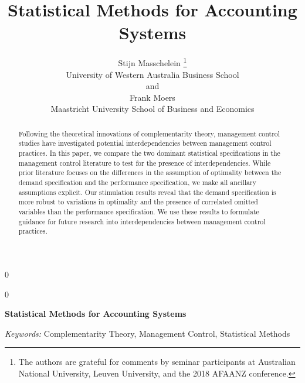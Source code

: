 \documentclass[12pt]{article}
\newcommand{\blind}{0}
\begin{document}
\def\spacingset#1{\renewcommand{\baselinestretch}%
{#1}\small\normalsize} \spacingset{1}


\blind
{
  \title{\bf Statistical Methods for Accounting Systems}

  \author{
        Stijn Masschelein \thanks{The authors are grateful for comments by seminar participants at
Australian National University, Leuven University, and the 2018 AFAANZ
conference.} \\
    University of Western Australia Business School\\
     and \\     Frank Moers \\
    Maastricht University School of Business and Economics\\
      }
  \maketitle
} \fi

\blind
{
  \bigskip
  \bigskip
  \bigskip
  \begin{center}
    {\LARGE\bf Statistical Methods for Accounting Systems}
  \end{center}
  \medskip
} \fi

\bigskip
\begin{abstract}
Following the theoretical innovations of complementarity theory,
management control studies have investigated potential interdependencies
between management control practices. In this paper, we compare the two
dominant statistical specifications in the management control literature
to test for the presence of interdependencies. While prior literature
focuses on the differences in the assumption of optimality between the
demand specification and the performance specification, we make all
ancillary assumptions explicit. Our stimulation results reveal that the
demand specification is more robust to variations in optimality and the
presence of correlated omitted variables than the performance
specification. We use these results to formulate guidance for future
research into interdependencies between management control practices.
\end{abstract}

\noindent%
{\it Keywords:} Complementarity Theory, Management Control, Statistical Methods
\vfill

\newpage

\spacingset{1.15}
\end{document}
